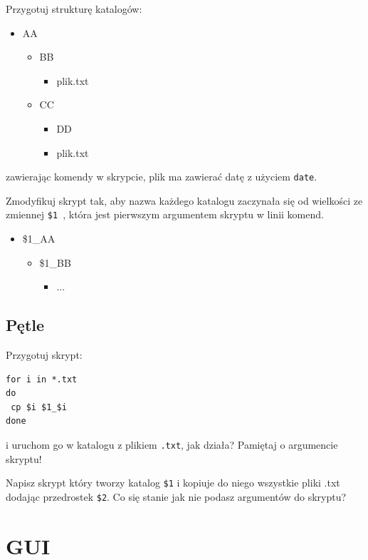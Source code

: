 \documentclass[landscape]{article}
\begin{document}
Przygotuj strukturę katalogów:

\begin{itemize}
 \item AA
  \begin{itemize}
   \item BB
    \begin{itemize}
     \item plik.txt
    \end{itemize}
   \item CC
    \begin{itemize}
     \item DD
     \item plik.txt
    \end{itemize}
  \end{itemize}
\end{itemize}

zawierając komendy w skrypcie, plik ma zawierać datę z użyciem {\tt date}.

Zmodyfikuj skrypt tak, aby nazwa każdego katalogu zaczynała się od wielkości ze zmiennej {\tt \$1 }, która jest pierwszym argumentem skryptu w linii komend.

\begin{itemize}
 \item \$1\_AA
  \begin{itemize}
   \item \$1\_BB
    \begin{itemize}
     \item ...
    \end{itemize}
  \end{itemize}
\end{itemize}


\subsection{Pętle}
Przygotuj skrypt:
\begin{verbatim}
for i in *.txt
do
 cp $i $1_$i
done
\end{verbatim}
i uruchom go w katalogu z plikiem {\tt .txt}, jak działa? Pamiętaj o argumencie skryptu!


Napisz skrypt który tworzy katalog {\tt \$1} i kopiuje do niego wszystkie pliki .txt dodając przedrostek {\tt \$2}. Co się stanie jak nie podasz argumentów do skryptu?


\section{GUI}
\end{document}

